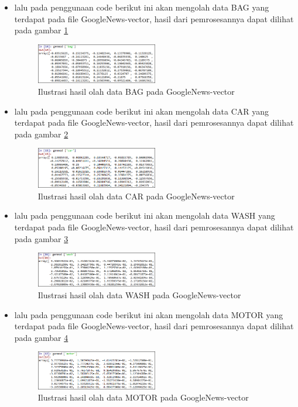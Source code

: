 \begin{enumerate}
\begin{itemize}
\item  lalu pada penggunaan code berikut ini akan mengolah data BAG yang terdapat pada file GoogleNews-vector, hasil dari pemrosesannya dapat dilihat pada gambar \ref{d14}
\begin{figure}[!htbp]
	\centering
	\includegraphics[width=0.5\textwidth]{figures/fathi/chapter5/hari2/8}
	\caption{Ilustrasi hasil olah data BAG pada GoogleNews-vector}
	\label{d14}
\end{figure}

\item  lalu pada penggunaan code berikut ini akan mengolah data CAR yang terdapat pada file GoogleNews-vector, hasil dari pemrosesannya dapat dilihat pada gambar \ref{d15}
\begin{figure}[!htbp]
	\centering
	\includegraphics[width=0.5\textwidth]{figures/fathi/chapter5/hari2/9}
	\caption{Ilustrasi hasil olah data CAR pada GoogleNews-vector}
	\label{d15}
\end{figure}

\item  lalu pada penggunaan code berikut ini akan mengolah data WASH yang terdapat pada file GoogleNews-vector, hasil dari pemrosesannya dapat dilihat pada gambar \ref{d16}
\begin{figure}[!htbp]
	\centering
	\includegraphics[width=0.5\textwidth]{figures/fathi/chapter5/hari2/10}
	\caption{Ilustrasi hasil olah data WASH pada GoogleNews-vector}
	\label{d16}
\end{figure}

\item  lalu pada penggunaan code berikut ini akan mengolah data MOTOR yang terdapat pada file GoogleNews-vector, hasil dari pemrosesannya dapat dilihat pada gambar \ref{d17}
\begin{figure}[!htbp]
	\centering
	\includegraphics[width=0.5\textwidth]{figures/fathi/chapter5/hari2/11}
	\caption{Ilustrasi hasil olah data MOTOR pada GoogleNews-vector}
	\label{d17}
\end{figure}


\end{itemize}
\end{enumerate}
